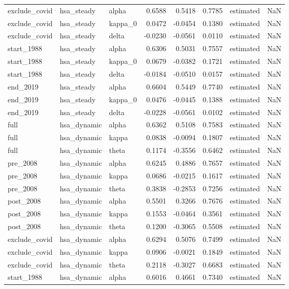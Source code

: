 \begin{tabular}{lllrrrlr}
exclude\_covid & hsa\_steady & alpha & 0.6588 & 0.5418 & 0.7785 & estimated & NaN \\
exclude\_covid & hsa\_steady & kappa\_0 & 0.0472 & -0.0454 & 0.1380 & estimated & NaN \\
exclude\_covid & hsa\_steady & delta & -0.0230 & -0.0561 & 0.0110 & estimated & NaN \\
start\_1988 & hsa\_steady & alpha & 0.6306 & 0.5031 & 0.7557 & estimated & NaN \\
start\_1988 & hsa\_steady & kappa\_0 & 0.0679 & -0.0382 & 0.1721 & estimated & NaN \\
start\_1988 & hsa\_steady & delta & -0.0184 & -0.0510 & 0.0157 & estimated & NaN \\
end\_2019 & hsa\_steady & alpha & 0.6604 & 0.5449 & 0.7740 & estimated & NaN \\
end\_2019 & hsa\_steady & kappa\_0 & 0.0476 & -0.0445 & 0.1388 & estimated & NaN \\
end\_2019 & hsa\_steady & delta & -0.0228 & -0.0561 & 0.0102 & estimated & NaN \\
full & hsa\_dynamic & alpha & 0.6362 & 0.5108 & 0.7583 & estimated & NaN \\
full & hsa\_dynamic & kappa & 0.0838 & -0.0094 & 0.1807 & estimated & NaN \\
full & hsa\_dynamic & theta & 0.1174 & -0.3556 & 0.6462 & estimated & NaN \\
pre\_2008 & hsa\_dynamic & alpha & 0.6245 & 0.4886 & 0.7657 & estimated & NaN \\
pre\_2008 & hsa\_dynamic & kappa & 0.0686 & -0.0215 & 0.1617 & estimated & NaN \\
pre\_2008 & hsa\_dynamic & theta & 0.3838 & -0.2853 & 0.7256 & estimated & NaN \\
post\_2008 & hsa\_dynamic & alpha & 0.5501 & 0.3266 & 0.7676 & estimated & NaN \\
post\_2008 & hsa\_dynamic & kappa & 0.1553 & -0.0464 & 0.3561 & estimated & NaN \\
post\_2008 & hsa\_dynamic & theta & 0.1200 & -0.3065 & 0.5508 & estimated & NaN \\
exclude\_covid & hsa\_dynamic & alpha & 0.6294 & 0.5076 & 0.7499 & estimated & NaN \\
exclude\_covid & hsa\_dynamic & kappa & 0.0906 & -0.0021 & 0.1849 & estimated & NaN \\
exclude\_covid & hsa\_dynamic & theta & 0.2118 & -0.3027 & 0.6683 & estimated & NaN \\
start\_1988 & hsa\_dynamic & alpha & 0.6016 & 0.4661 & 0.7340 & estimated & NaN \\

\end{tabular}
